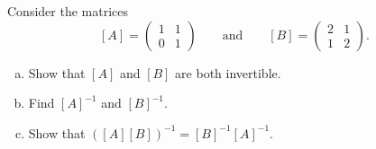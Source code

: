 \documentclass[12pt]{article} %
\begin{document}
\newpage
\begin{problem}
Consider the matrices 
\[
[A] = \begin{pmatrix} 1 & 1 \\ 0 & 1 \end{pmatrix} \qquad \textrm{and} \qquad [B] = \begin{pmatrix} 2 & 1 \\ 1 & 2 \end{pmatrix}.
\]
\begin{enumerate}[(a)]
    \item Show that $[A]$ and $[B]$ are both invertible.
    \item Find $[A]^{-1}$ and $[B]^{-1}$.
    \item Show that $([A][B])^{-1} = [B]^{-1} [A]^{-1}$.
\end{enumerate}
\end{problem}
\end{document}
